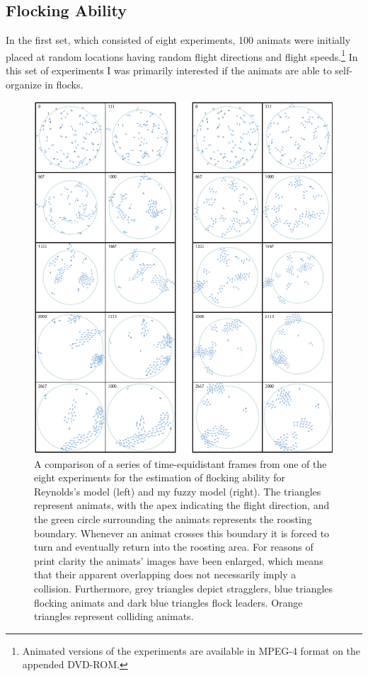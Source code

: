 \subsection{Flocking Ability}
In the first set, which consisted of eight experiments, 100 animats were initially placed at random locations having random flight directions and flight speeds.\footnote{Animated versions of the experiments are available in MPEG-4 format on the appended DVD-ROM.} In this set of experiments I was primarily interested if the animats are able to self-organize in flocks.
%
\begin{figure}%
\null\vspace*{1mm}
\includegraphics{fig[exp0101]}
\par\vspace*{1mm}
\caption{A comparison of a series of time-equidistant frames from one of the eight experiments for the estimation of flocking ability for Reynolds's model \cite{reynolds:1999} (left) and my fuzzy model (right). The triangles represent animats, with the apex indicating the flight direction, and the green circle surrounding the animats represents the roosting boundary. Whenever an animat crosses this boundary it is forced to turn and eventually return into the roosting area. For reasons of print clarity the animats' images have been enlarged, which means that their apparent overlapping does not necessarily imply a collision. Furthermore, grey triangles depict stragglers, blue triangles flocking animats and dark blue triangles flock leaders. Orange triangles represent colliding animats.}
\label{fig:exp:01:01}
\end{figure}
